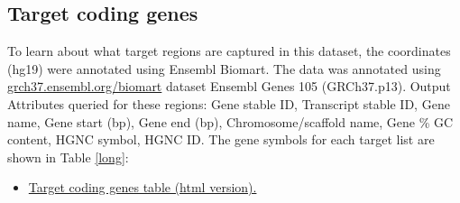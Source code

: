\documentclass{article}
\begin{document}
\clearpage
\subsection{Target coding genes}
\label{coding}
To learn about what target regions are captured in this dataset, the coordinates (hg19) were annotated using Ensembl Biomart. The data was annotated using 
\href{http://grch37.ensembl.org/biomart/martview/3b67c8bb1f8be31e245e76a1b368fc8b}{grch37.ensembl.org/biomart}
dataset Ensembl Genes 105 (GRCh37.p13).
Output Attributes queried for these regions: Gene stable ID, Transcript stable ID, Gene name, Gene start (bp), Gene end (bp), Chromosome/scaffold name, Gene \% GC content, HGNC symbol, HGNC ID.
The gene symbols for each target list are shown in Table \ref{long}:
\begin{itemize}
	\item \href{https://lawlessgenomics.com/pages/sophia/target_info_biomart_simple.html}{Target coding genes table (html version).}
\end{itemize}
\end{document}
